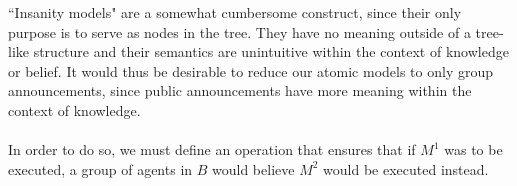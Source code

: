 \documentclass[12pt, a4paper, titlepage]{scrartcl}
\begin{document}
%
``Insanity models" are a somewhat cumbersome construct, since their only purpose
is to serve as nodes in the tree.
They have no meaning outside of a tree-like structure and their semantics are
unintuitive within the context of knowledge or belief.
It would thus be desirable to reduce our atomic models to only group
announcements, since public announcements have more meaning within the context of
knowledge.\\
\\
In order to do so, we must define an operation that ensures that if $M^1$ was to
be executed, a group of agents in $B$ would believe $M^2$ would be executed
instead.
\end{document}
